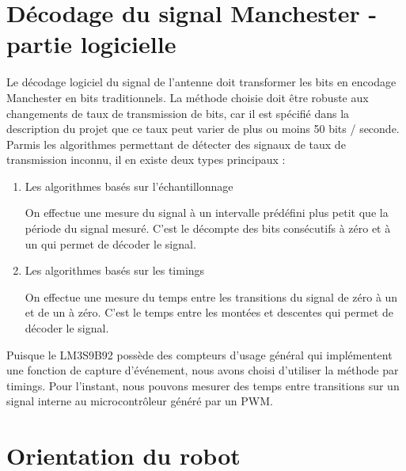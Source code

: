 \section{Décodage du signal Manchester - partie logicielle}

Le décodage logiciel du signal de l'antenne doit transformer les bits en encodage Manchester en bits traditionnels. La méthode choisie doit être robuste aux changements de taux de transmission de bits, car il est spécifié dans la description du projet que ce taux peut varier de plus ou moins 50 bits / seconde. Parmis les algorithmes permettant de détecter des signaux de taux de transmission inconnu, il en existe deux types principaux : 

\begin{enumerate}
\item{Les algorithmes basés sur l'échantillonnage}

On effectue une mesure du signal à un intervalle prédéfini plus petit que la période du signal mesuré. C'est le décompte des bits consécutifs à zéro et à un qui permet de décoder le signal.

\item{Les algorithmes basés sur les timings} 

On effectue une mesure du temps entre les transitions du signal de zéro à un et de un à zéro. C'est le temps entre les montées et descentes qui permet de décoder le signal.
\end{enumerate}

Puisque le LM3S9B92 possède des compteurs d'usage général qui implémentent une fonction de capture d'événement, nous avons choisi d'utiliser la méthode par timings. Pour l'instant, nous pouvons mesurer des temps entre transitions sur un signal interne au microcontrôleur généré par un PWM.


\section{Orientation du robot}

